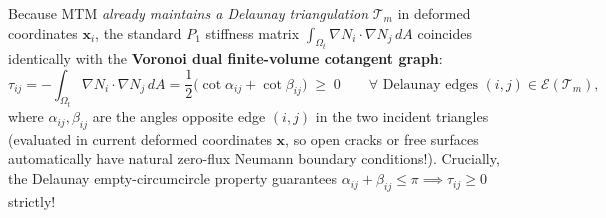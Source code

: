 \documentclass[11pt,a4paper]{article}
\begin{document}
Because MTM \emph{already maintains a Delaunay triangulation} $\mathcal{T}_m$ in deformed coordinates $\mathbf{x}_i$, the standard $P_1$ stiffness matrix $\int_{\Omega_t} \nabla N_i \cdot \nabla N_j\,dA$ coincides identically with the \textbf{Voronoi dual finite-volume cotangent graph}:
\begin{equation}
  \tau_{ij} = -\int_{\Omega_t} \nabla N_i \cdot \nabla N_j\,dA
  = \frac{1}{2}\bigl(\cot \alpha_{ij} + \cot \beta_{ij}\bigr) \;\ge\; 0
  \qquad \forall \text{ Delaunay edges } (i,j) \in \mathcal{E}(\mathcal{T}_m),
  \label{eq:cotangent}
\end{equation}
where $\alpha_{ij}, \beta_{ij}$ are the angles opposite edge $(i,j)$ in the two incident triangles (evaluated in current deformed coordinates $\mathbf{x}$, so open cracks or free surfaces automatically have natural zero-flux Neumann boundary conditions!). Crucially, the Delaunay empty-circumcircle property guarantees $\alpha_{ij} + \beta_{ij} \le \pi \implies \tau_{ij} \ge 0$ strictly!
\end{document}
